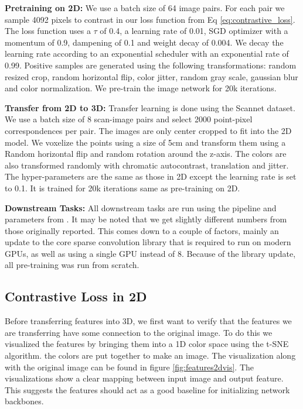 \documentclass[10pt,twocolumn,letterpaper]{article}
\begin{document}
\textbf{Pretraining on 2D:} We use a batch size of 64 image pairs. For each pair we sample 4092 pixels to contrast in our loss function from Eq \ref{eq:contrastive_loss}. The loss function uses a $\tau$ of 0.4, a learning rate of 0.01, SGD optimizer with a momentum of 0.9, dampening of 0.1 and weight decay of 0.004. We decay the learning rate according to an exponential scheduler with an exponential rate of 0.99. Positive samples are generated using the following transformations: random resized crop, random horizontal flip, color jitter, random gray scale, gaussian blur and color normalization. We pre-train the image network for 20k iterations.

\textbf{Transfer from 2D to 3D:} Transfer learning is done using the Scannet dataset. We use a batch size of 8 scan-image pairs and select 2000 point-pixel correspondences per pair. The images are only center cropped to fit into the 2D model. We voxelize the points using a size of 5cm and transform them using a Random horizontal flip and random rotation around the z-axis. The colors are also transformed randomly with chromatic autocontrast, translation and jitter. The hyper-parameters are the same as those in 2D except the learning rate is set to 0.1. It is trained for 20k iterations same as pre-training on 2D.

\textbf{Downstream Tasks:} All downstream tasks are run using the pipeline and parameters from \cite{hou2021Exploring}. It may be noted that we get slightly different numbers from those originally reported. This comes down to a couple of factors, mainly an update to the core sparse convolution library that is required to run on modern GPUs, as well as using a single GPU instead of 8. Because of the library update, all pre-training was run from scratch.

\subsection{Contrastive Loss in 2D}
\label{sec:results:2d}

Before transferring features into 3D, we first want to verify that the features we are transferring have some connection to the original image. To do this we visualized the features by bringing them into a 1D color space using the t-SNE \cite{maaten2008Visualizing} algorithm. the colors are put together to make an image. The visualization along with the original image can be found in figure \ref{fig:features2dvis}. The visualizations show a clear mapping between input image and output feature. This suggests the features should act as a good baseline for initializing network backbones.
\end{document}
